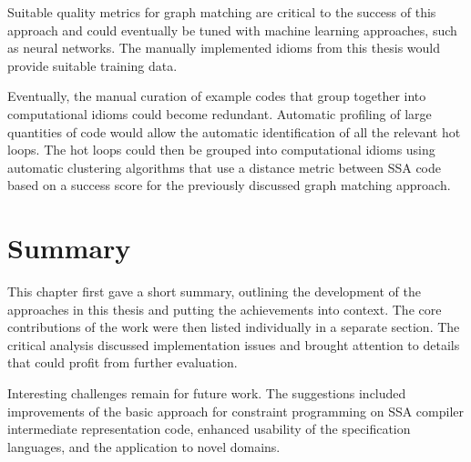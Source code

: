     Suitable quality metrics for graph matching are critical to the success
    of this approach and could eventually be tuned with machine learning
    approaches, such as neural networks.
    The manually implemented idioms from this thesis would provide suitable
    training data.

    Eventually, the manual curation of example codes that group together into
    computational idioms could become redundant.
    Automatic profiling of large quantities of code would allow the automatic
    identification of all the relevant hot loops.
    The hot loops could then be grouped into computational idioms using
    automatic clustering algorithms that use a distance metric between SSA code
    based on a success score for the previously discussed graph matching
    approach.

\section{Summary}

    This chapter first gave a short summary, outlining the development of the
    approaches in this thesis and putting the achievements into context.
    The core contributions of the work were then listed individually in a
    separate section.
    The critical analysis discussed implementation issues and brought attention
    to details that could profit from further evaluation.

    Interesting challenges remain for future work.
    The suggestions included improvements of the basic approach for constraint
    programming on SSA compiler intermediate representation code, enhanced
    usability of the specification languages, and the application to novel domains.
